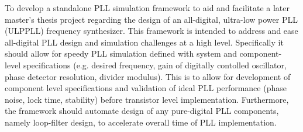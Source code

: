 	To develop a standalone PLL simulation framework to aid and facilitate a later master's thesis project regarding the design of an all-digital, ultra-low power PLL (ULPPLL) frequency synthesizer. This framework is intended to address and ease all-digital PLL design and simulation challenges at a high level. Specifically it should allow for speedy PLL simulation defined with system and component- level specifications (e.g. desired frequency, gain of digitally contolled oscillator, phase detector resolution, divider modulus). This is to allow for development of component level specifications and validation of ideal PLL performance (phase noise, lock time, stability) before transistor level implementation. Furthermore, the framework should automate design of any pure-digital PLL components, namely loop-filter design, to accelerate overall time of PLL implementation.


	\fontfamily{\sfdefault}\selectfont 
	\thispagestyle{nohdr}
	\null\pagebreak
	\thispagestyle{nohdr}
	\null\pagebreak
	\tableofcontents
	\pagebreak
	\listoffigures
	\listoftables


	\fontfamily{\rmdefault}\selectfont 
	

	\pagebreak
	\FloatBarrier
	
	\pagebreak
	\FloatBarrier
	
	

	


    

    \FloatBarrier


